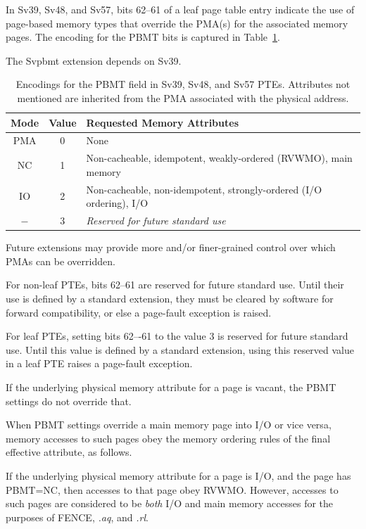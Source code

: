 In Sv39, Sv48, and Sv57, bits 62--61 of a leaf page table entry indicate the use
of page-based memory types that override the PMA(s) for the associated memory
pages.  The encoding for the PBMT bits is captured in Table~\ref{pbmt}.

The Svpbmt extension depends on Sv39.

\begin{table}[h!]
\begin{center}
\begin{tabular}{|c|c|l|}
\hline
Mode & Value  & Requested Memory Attributes \\
\hline
PMA  & 0      & None \\
NC   & 1      & Non-cacheable, idempotent, weakly-ordered (RVWMO), main memory \\
IO   & 2      & Non-cacheable, non-idempotent, strongly-ordered (I/O ordering), I/O \\
$-$  & 3      & {\em Reserved for future standard use} \\
\hline
\end{tabular}
\end{center}
\caption{Encodings for the PBMT field in Sv39, Sv48, and Sv57 PTEs.  Attributes
not mentioned are inherited from the PMA associated with the physical address.}
\label{pbmt}
\end{table}

\begin{commentary}
Future extensions may provide more and/or finer-grained control over which PMAs
can be overridden.
\end{commentary}

For non-leaf PTEs, bits 62--61 are reserved for future standard use.  Until
their use is defined by a standard extension, they must be cleared by software
for forward compatibility, or else a page-fault exception is raised.

For leaf PTEs, setting bits 62–-61 to the value 3 is reserved for future
standard use.
Until this value is defined by a standard extension, using this reserved value
in a leaf PTE raises a page-fault exception.

If the underlying physical memory attribute for a page is vacant, the PBMT settings do not override that.

When PBMT settings override a main memory page into I/O or vice versa, memory
accesses to such pages obey the memory ordering rules of the final effective
attribute, as follows.

If the underlying physical memory attribute for a page is I/O, and the page has
PBMT=NC, then accesses to that page obey RVWMO.
However, accesses to such pages are
considered to be {\em both} I/O and main memory accesses for the purposes of FENCE,
{\em.aq}, and {\em.rl}.

